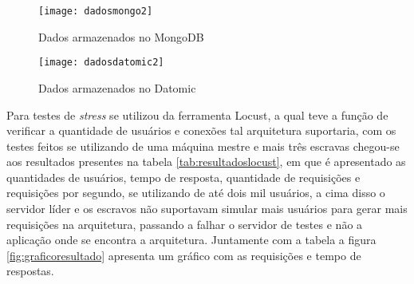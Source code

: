 \begin{figure}[!h]
\caption{\label{fig:dadosmongo} Dados armazenados no MongoDB}
\begin{center}
\texttt{[image: dadosmongo2]}
\end{center}
\end{figure}

\begin{figure}[!h]
\caption{\label{fig:dadosdatomic} Dados armazenados no Datomic}
\begin{center}
\texttt{[image: dadosdatomic2]}
\end{center}
\end{figure}


Para testes de \textit{stress} se utilizou da ferramenta Locust, a qual teve a função de verificar a quantidade de usuários e conexões tal arquitetura suportaria, com os testes feitos se utilizando de uma máquina mestre e mais três escravas chegou-se aos resultados presentes na tabela \ref{tab:resultadoslocust}, em que é apresentado as quantidades de usuários, tempo de resposta, quantidade de requisições e requisições por segundo, se utilizando de até dois mil usuários, a cima disso o servidor líder e os escravos não suportavam simular mais usuários para gerar mais requisições na arquitetura, passando a falhar o servidor de testes e não a aplicação onde se encontra a arquitetura. Juntamente com a tabela a figura \ref{fig:graficoresultado} apresenta um gráfico com as requisições e tempo de respostas.

